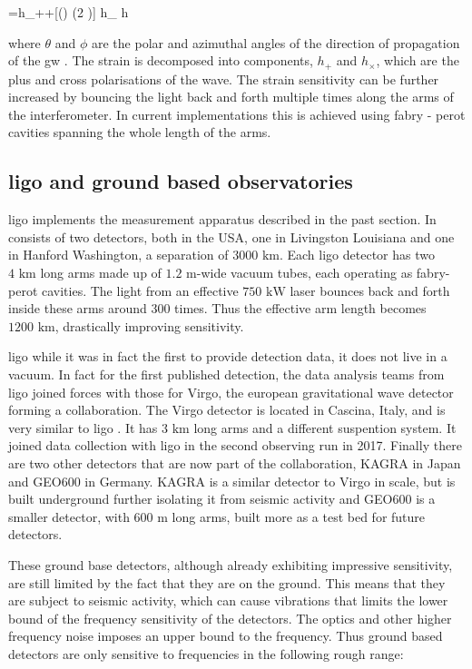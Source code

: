 \documentclass[
  10pt,
  a4paper,
  DIV=11,
  numbers=noendperiod,
  twoside]{scrreprt}
\let\[\relax \let\]\relax %
\DeclareRobustCommand{\[}{\begin{equation}}
\DeclareRobustCommand{\]}{\end{equation}}
\begin{document}
\[
= h_{+}+[\cos (\theta) \sin (2 \phi)] h_{\times} \equiv h
\]

where \(\theta\) and \(\phi\) are the polar and azimuthal angles of the
direction of propagation of the \gls{gw} . The strain is decomposed into
components, \(h_{+}\) and \(h_{\times}\), which are the plus and cross
polarisations of the wave. The strain sensitivity can be further
increased by bouncing the light back and forth multiple times along the
arms of the interferometer. In current implementations this is achieved
using fabry - perot cavities spanning the whole length of the arms.

\hypertarget{sec-ligo}{%
\subsection{\texorpdfstring{\gls{ligo} and ground based
observatories}{ and ground based observatories}}\label{sec-ligo}}

\gls{ligo} implements the measurement apparatus described in the past
section. In consists of two detectors, both in the USA, one in
Livingston Louisiana and one in Hanford Washington, a separation of
\(3000 \text{ km}\). Each \gls{ligo} detector has two \(4\text{ km}\)
long arms made up of \(1.2\text{ m}\)-wide vacuum tubes, each operating
as fabry-perot cavities. The light from an effective \(750\text{ kW}\)
laser bounces back and forth inside these arms around 300 times. Thus
the effective arm length becomes \(1200\text{ km}\), drastically
improving sensitivity.

\gls{ligo} while it was in fact the first to provide detection data, it
does not live in a vacuum. In fact for the first published detection,
the data analysis teams from \gls{ligo} joined forces with those for
Virgo, the european gravitational wave detector forming a collaboration.
The Virgo detector is located in Cascina, Italy, and is very similar to
\gls{ligo} . It has \(3\text{ km}\) long arms and a different suspention
system. It joined data collection with \gls{ligo} in the second
observing run in 2017. Finally there are two other detectors that are
now part of the collaboration, KAGRA in Japan and GEO600 in Germany.
KAGRA is a similar detector to Virgo in scale, but is built underground
further isolating it from seismic activity and GEO600 is a smaller
detector, with \(600 \text{ m}\) long arms, built more as a test bed for
future detectors.

These ground base detectors, although already exhibiting impressive
sensitivity, are still limited by the fact that they are on the ground.
This means that they are subject to seismic activity, which can cause
vibrations that limits the lower bound of the frequency sensitivity of
the detectors. The optics and other higher frequency noise imposes an
upper bound to the frequency. Thus ground based detectors are only
sensitive to frequencies in the following rough range:
\end{document}
